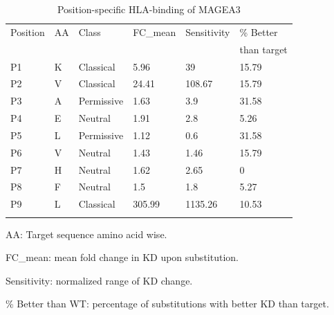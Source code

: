 \documentclass[unnumsec,webpdf,contemporary,large]{oup-authoring-template}%
\theoremstyle{thmstyleone}%
\theoremstyle{thmstyletwo}%
\theoremstyle{thmstylethree}%
\begin{document}
        \begin{table}[!htbp]
        \centering
        \begin{minipage}{0.7\textwidth}
            \caption{Position-specific HLA-binding of MAGEA3\label{tab:xscan}}%
            \begin{tabular}{@{}llllll@{}}
                \toprule
                Position & AA & Class & FC\_mean & Sensitivity & \% Better \\
                 &  &  &  &  & than target \\
                \midrule
                P1 & K & Classical & 5.96 & 39 & 15.79 \\
                P2 & V & Classical & 24.41 & 108.67 & 15.79 \\
                P3 & A & Permissive & 1.63 & 3.9 & 31.58 \\
                P4 & E & Neutral & 1.91 & 2.8 & 5.26 \\
                P5 & L & Permissive & 1.12 & 0.6 & 31.58 \\
                P6 & V & Neutral & 1.43 & 1.46 & 15.79 \\
                P7 & H & Neutral & 1.62 & 2.65 & 0 \\
                P8 & F & Neutral & 1.5 & 1.8 & 5.27 \\
                P9 & L & Classical & 305.99 & 1135.26 & 10.53 \\
                \botrule
            \end{tabular}
            \begin{tablenotes}
                \item AA: Target sequence amino acid wise. 
                \item FC\_mean: mean fold change in KD upon substitution.
                \item Sensitivity: normalized range of KD change.
                \item \% Better than WT: percentage of substitutions with better KD than target.
            \end{tablenotes}
        \end{minipage}
        \end{table}
\end{document}
